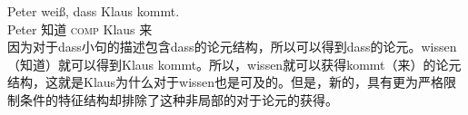 \ea
\gll Peter weiß, dass Klaus kommt.\\
	 Peter 知道 \textsc{comp} Klaus 来\\
\z
因为对于dass小句的描述包含dass的论元结构，所以可以得到dass的论元。wissen（知道）就可以得到Klaus kommt。所以，wissen就可以获得kommt（来）的论元结构，这就是Klaus为什么对于wissen也是可及的。但是，新的，具有更为严格限制条件的特征结构却排除了这种非局部的对于论元的获得。

